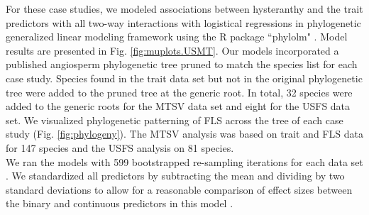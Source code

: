 \documentclass[11pt]{article}\usepackage[]{graphicx}\usepackage[]{color}
\begin{document}
\noindent For these case studies, we modeled associations between hysteranthy and the trait predictors with all two-way interactions with logistical regressions in phylogenetic generalized linear modeling framework \citep{Ives2010} using the R package ``phylolm" \citep{Ho2014}. Model results are presented in Fig. \ref{fig:muplots.USMT}. Our models incorporated a published angiosperm phylogenetic tree \citep{Zanne2013} pruned to match the species list for each case study. Species found in the trait data set but not in the original phylogenetic tree were added to the pruned tree at the generic root. In total, 32 species were added to the generic roots for the MTSV data set and eight for the USFS data set. We visualized phylogenetic patterning of FLS across the tree of each case study (Fig. \ref{fig:phylogeny}). The MTSV analysis was based on trait and FLS data for 147 species and the USFS analysis on 81 species. \\

\noindent We ran the models with 599 bootstrapped re-sampling iterations for each data set \citep{Wilcox2010}. We standardized all predictors by subtracting the mean and dividing by two standard deviations to allow for a reasonable comparison of effect sizes between the binary and continuous predictors in this model \citep{Gelman2007}. 
\end{document}
